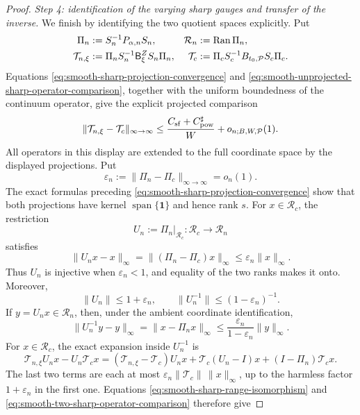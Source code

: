 \documentclass[11pt]{article}
\numberwithin{equation}{section}
\theoremstyle{definition}
\theoremstyle{remark}
\newcommand{\1}{\mathbf 1}
\begin{document}
\begin{proof}
\medskip\noindent
\emph{Step 4: identification of the varying sharp gauges and transfer
of the inverse.}\quad
We finish by identifying the two quotient spaces explicitly.  Put
\begin{align}
 \Pi_n&:=S_n^{-1}P_{\alpha,n}S_n,
 &\mathcal R_n&:=\operatorname{Ran}\Pi_n,\notag\\
 \mathcal T_{n,\xi}
 &:=\Pi_nS_n^{-1}\mathsf B^Z_\xi S_n\Pi_n,
 &\mathcal T_c&:=\Pi_cS_c^{-1}B_{t_0,\mathcal P}S_c\Pi_c.
 \label{eq:smooth-two-sharp-projected-operators}
\end{align}
Equations \eqref{eq:smooth-sharp-projection-convergence} and
\eqref{eq:smooth-unprojected-sharp-operator-comparison}, together with
the uniform boundedness of the continuum operator, give the explicit
projected comparison
\begin{equation}
 \|\mathcal T_{n,\xi}-\mathcal T_c\|_{\infty\to\infty}
 \le \frac{C_{\rm sf}+C_{\rm pow}^{\sharp}}W
       +o_{n;B,W,\mathcal P}(1).
 \label{eq:smooth-two-sharp-operator-comparison}
\end{equation}
All operators in this display are extended to the full coordinate
space by the displayed projections.  Put
\[
 \varepsilon_n:=\|\Pi_n-\Pi_c\|_{\infty\to\infty}=o_n(1).
\]
The exact formulas preceding
\eqref{eq:smooth-sharp-projection-convergence} show that both projections
have kernel \(\operatorname{span}\{\mathbf1\}\) and hence rank \(s\).
For \(x\in\mathcal R_c\), the restriction
\[
 U_n:=\Pi_n|_{\mathcal R_c}:\mathcal R_c\longrightarrow\mathcal R_n
\]
satisfies
\[
 \|U_nx-x\|_\infty
 =\|(\Pi_n-\Pi_c)x\|_\infty
 \leq\varepsilon_n\|x\|_\infty.
\]
Thus \(U_n\) is injective when \(\varepsilon_n<1\), and equality of the
two ranks makes it onto.  Moreover,
\begin{equation}
 \|U_n\|\leq1+\varepsilon_n,\qquad
 \|U_n^{-1}\|\leq(1-\varepsilon_n)^{-1}.
 \label{eq:smooth-sharp-range-isomorphism}
\end{equation}
If \(y=U_nx\in\mathcal R_n\), then, under the ambient coordinate
identification,
\[
 \|U_n^{-1}y-y\|_\infty=\|x-\Pi_nx\|_\infty
 \leq\frac{\varepsilon_n}{1-\varepsilon_n}\|y\|_\infty.
\]
For \(x\in\mathcal R_c\), the exact expansion inside \(U_n^{-1}\) is
\[
 \mathcal T_{n,\xi}U_nx-U_n\mathcal T_cx
 =(\mathcal T_{n,\xi}-\mathcal T_c)U_nx
   +\mathcal T_c(U_n-I)x
   +(I-\Pi_n)\mathcal T_cx.
\]
The last two terms are each at most
\(\varepsilon_n\|\mathcal T_c\|\,\|x\|_\infty\), up to the harmless
factor \(1+\varepsilon_n\) in the first one.  Equations
\eqref{eq:smooth-sharp-range-isomorphism} and
\eqref{eq:smooth-two-sharp-operator-comparison} therefore give

\end{proof}
\end{document}
